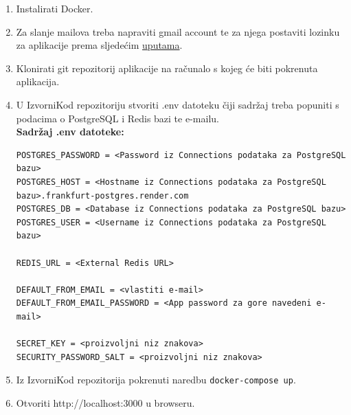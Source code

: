 			\begin{enumerate}
			    \item Instalirati Docker.
			    \item Za slanje mailova treba napraviti gmail account te za njega postaviti lozinku za aplikacije prema sljedećim \href{https://support.google.com/mail/answer/185833?hl=en}{uputama}.
			    \item Klonirati git repozitorij aplikacije na računalo s kojeg će biti pokrenuta aplikacija.
			    \item U IzvorniKod repozitoriju stvoriti .env datoteku čiji sadržaj treba popuniti s podacima o PostgreSQL i Redis bazi te e-mailu.
			\\\textbf{Sadržaj .env datoteke:}
\begin{verbatim}
POSTGRES_PASSWORD = <Password iz Connections podataka za PostgreSQL bazu>
POSTGRES_HOST = <Hostname iz Connections podataka za PostgreSQL bazu>.frankfurt-postgres.render.com
POSTGRES_DB = <Database iz Connections podataka za PostgreSQL bazu>
POSTGRES_USER = <Username iz Connections podataka za PostgreSQL bazu>

REDIS_URL = <External Redis URL>

DEFAULT_FROM_EMAIL = <vlastiti e-mail>
DEFAULT_FROM_EMAIL_PASSWORD = <App password za gore navedeni e-mail>

SECRET_KEY = <proizvoljni niz znakova>
SECURITY_PASSWORD_SALT = <proizvoljni niz znakova>
\end{verbatim}
                \item Iz IzvorniKod repozitorija pokrenuti naredbu \texttt{docker-compose up}.
                \item Otvoriti http://localhost:3000 u browseru.
			 
			\end{enumerate}
			
			\text{}
		
			
			
			\eject 